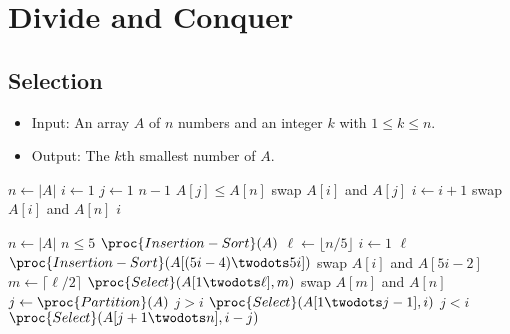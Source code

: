 \chapter{Divide and Conquer}
\section{Selection}
\begin{problem}
  \leavevmode
  \begin{itemize}
    \item Input: An array $A$ of $n$ numbers and an integer $k$ with $1 \leq k
    \leq n$.
    \item Output: The $k$th smallest number of $A$.
  \end{itemize}
\end{problem}

\begin{codebox}
  \li $n \gets |A|$
  \li $i \gets 1$
  \li \For $j \gets 1$ \To $n - 1$ \Do
  \li     \If $A[j] \leq A[n]$ \Then
  \li         swap $A[i]$ and $A[j]$
  \li         $i \gets i + 1$
          \End
      \End
  \li swap $A[i]$ and $A[n]$
  \li \Return $i$
\end{codebox}

\begin{codebox}
  \li $n \gets |A|$
  \li \If $n \leq 5$ \Then
  \li     $\proc{Insertion-Sort}(A)$
  \li \Else
  \li     $\ell \gets \lfloor n/5 \rfloor$
  \li     \For $i \gets 1$ \To $\ell$ \Do
  \li         $\proc{Insertion-Sort}(A[(5i-4) \twodots 5i])$
  \li         swap $A[i]$ and $A[5i-2]$
          \End
  \li     $m \gets \lceil \ell/2 \rceil$
  \li     $\proc{Select}(A[1 \twodots \ell], m)$
  \li     swap $A[m]$ and $A[n]$
  \li     $j \gets \proc{Partition}(A)$
  \li     \If $j > i$ \Then
  \li         $\proc{Select}(A[1 \twodots j-1], i)$
  \li     \ElseIf $j < i$ \Then
  \li         $\proc{Select}(A[j+1 \twodots n], i - j)$
          \End
      \End
\end{codebox}

